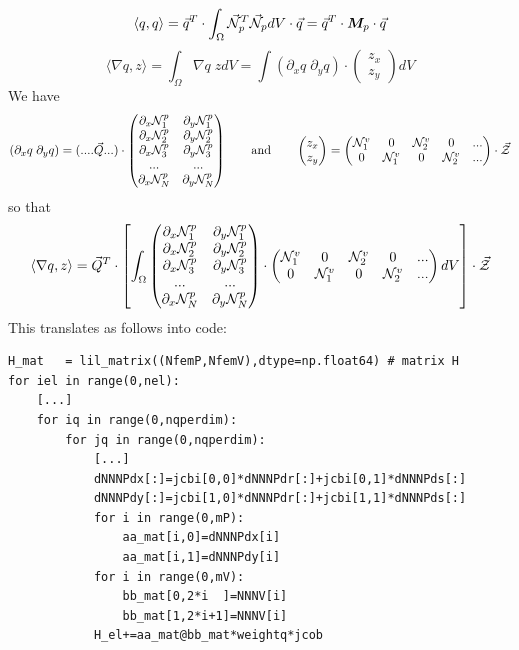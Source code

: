 \[
\langle q,q \rangle 
= \vec{q}^T \cdot \int_\Omega \vec{\cal N}_p^T \vec{\cal N}_p dV \cdot \vec{q} = \vec{q}^T \cdot {\bm M}_p \cdot \vec{q}
\]
\[
\langle \nabla q,z\rangle = \int_\Omega  \nabla q \; z dV = 
\int (\partial_x q \; \partial_y q) \cdot 
\begin{pmatrix}
z_x \\ z_y
\end{pmatrix}
dV
\]
We have 
\[
(\partial_x q \; \partial_y q) =
(.... \vec{Q} ... ) \cdot
\begin{pmatrix}
\partial_x {\mathcal{N}}_1^p & \partial_y {\mathcal{N}}_1^ p\\
\partial_x {\mathcal{N}}_2^p & \partial_y {\mathcal{N}}_2^ p\\
\partial_x {\mathcal{N}}_3^p & \partial_y {\mathcal{N}}_3^ p\\
...  & ... \\
\partial_x {\mathcal{N}}_N^p & \partial_y {\mathcal{N}}_N^ p
\end{pmatrix}
\qquad
\text{and}
\qquad
\begin{pmatrix}
z_x \\ z_y
\end{pmatrix}
=
\begin{pmatrix}
{\mathcal{N}}_1^v & 0 & {\mathcal{N}}_2^v & 0 & ... \\
0 & {\mathcal{N}}_1^v & 0 & {\mathcal{N}}_2^v & ... \\
\end{pmatrix}
\cdot
\vec{\cal Z}
\]
so that 
\[
\langle \nabla q,z\rangle
= 
\vec{Q}^T \cdot 
\left[
\int_\Omega
\begin{pmatrix}
\partial_x {\mathcal{N}}_1^p & \partial_y {\mathcal{N}}_1^ p\\
\partial_x {\mathcal{N}}_2^p & \partial_y {\mathcal{N}}_2^ p\\
\partial_x {\mathcal{N}}_3^p & \partial_y {\mathcal{N}}_3^ p\\
...  & ... \\
\partial_x {\mathcal{N}}_N^p & \partial_y {\mathcal{N}}_N^ p
\end{pmatrix}
\cdot
\begin{pmatrix}
{\mathcal{N}}_1^v & 0 & {\mathcal{N}}_2^v & 0 & ... \\
0 & {\mathcal{N}}_1^v & 0 & {\mathcal{N}}_2^v & ... \\
\end{pmatrix}
dV \right]
\cdot
\vec{\cal Z}
\]
This translates as follows into code:

\begin{lstlisting}
H_mat   = lil_matrix((NfemP,NfemV),dtype=np.float64) # matrix H 
for iel in range(0,nel):
    [...]
    for iq in range(0,nqperdim):
        for jq in range(0,nqperdim):
            [...]
            dNNNPdx[:]=jcbi[0,0]*dNNNPdr[:]+jcbi[0,1]*dNNNPds[:]
            dNNNPdy[:]=jcbi[1,0]*dNNNPdr[:]+jcbi[1,1]*dNNNPds[:]
            for i in range(0,mP):
                aa_mat[i,0]=dNNNPdx[i]
                aa_mat[i,1]=dNNNPdy[i]
            for i in range(0,mV):
                bb_mat[0,2*i  ]=NNNV[i] 
                bb_mat[1,2*i+1]=NNNV[i] 
            H_el+=aa_mat@bb_mat*weightq*jcob
\end{lstlisting}

